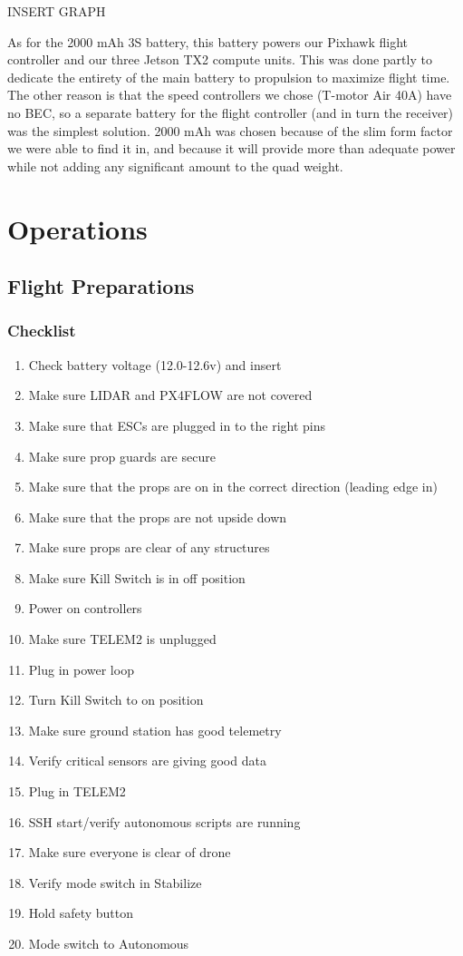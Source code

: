 \documentclass[12pt,letterpaper]{article}
\begin{document}
		INSERT GRAPH

		As for the 2000 mAh 3S battery, this battery powers our Pixhawk flight controller and our three Jetson TX2 compute units. This was done partly to dedicate the entirety of the main battery to propulsion to maximize flight time. The other reason is that the speed controllers we chose (T-motor Air 40A) have no BEC, so a separate battery for the flight controller (and in turn the receiver) was the simplest solution. 2000 mAh was chosen because of the slim form factor we were able to find it in, and because it will provide more than adequate power while not adding any significant amount to the quad weight.


\section*{Operations}
	\subsection*{Flight Preparations}
		\subsubsection*{Checklist}
			\begin{enumerate}
				\item Check battery voltage (12.0-12.6v) and insert
				\item Make sure LIDAR and PX4FLOW are not covered
				\item Make sure that ESCs are plugged in to the right pins
				\item Make sure prop guards are secure
				\item Make sure that the props are on in the correct direction (leading edge in)
				\item Make sure that the props are not upside down
				\item Make sure props are clear of any structures
				\item Make sure Kill Switch is in off position
				\item Power on controllers
				\item Make sure TELEM2 is unplugged
				\item Plug in power loop
				\item Turn Kill Switch to on position
				\item Make sure ground station has good telemetry
				\item Verify critical sensors are giving good data
				\item Plug in TELEM2
				\item SSH start/verify autonomous scripts are running
				\item Make sure everyone is clear of drone
				\item Verify mode switch in Stabilize
				\item Hold safety button
				\item Mode switch to Autonomous
			\end{enumerate}
\end{document}

